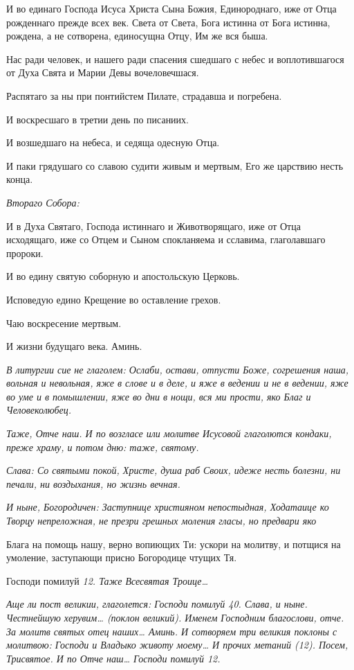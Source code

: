    И во единаго Господа Исуса Христа Сына Божия, Единороднаго, иже от
Отца рожденнаго прежде всех век. Света от Света, Бога истинна от
Бога истинна, рождена, а не сотворена, единосущна Отцу, Им же вся
быша.


   Нас ради человек, и нашего ради спасения сшедшаго с небес и
воплотившагося от Духа Свята и Марии Девы вочеловечшася.


   Распятаго за ны при понтийстем Пилате, страдавша и погребена.


   И воскресшаго в третии день по писаниих.


   И возшедшаго на небеса, и седяща одесную Отца.


   И паки грядушаго со славою судити живым и мертвым, Его же царствию
несть конца.


 \itshape Втораго Собора:\normalfont{}


   И в Духа Святаго, Господа истиннаго и Животворящаго, иже от Отца
исходящаго, иже со Отцем и Сыном спокланяема и сславима, глаголавшаго
пророки.


   И во едину святую соборную и апостольскую Церковь.


   Исповедую едино Крещение во оставление грехов.


   Чаю воскресение мертвым.


   И жизни будущаго века. Аминь.


 \itshape В литургии сие не глаголем:\normalfont{} Ослаби, остави, отпусти Боже, согрешения
наша, вольная и невольная, яже в слове и в деле, и яже в ведении и не в
ведении, яже во уме и в помышлении, яже во дни в нощи, вся ми прости, яко
Благ и Человеколюбец.


 \itshape Таже, Отче наш. И по возгласе или молитве Исусовой глаголются
кондаки, преже храму, и потом дню: таже, святому.\normalfont{}


 \itshape Слава:\normalfont{} Со святыми покой, Христе, душа раб Своих, идеже несть болезни,
ни печали, ни воздыхания, но жизнь вечная.


 \itshape И ныне, Богородичен:\normalfont{} Заступнице християном непостыдная, Ходатаице
ко Творцу непреложная, не презри грешных моления гласы, но предвари яко

Блага на помощь нашу, верно вопиющих Ти: ускори на молитву, и потщися
на умоление, заступающи присно Богородице чтущих Тя.


   Господи помилуй \itshape 12\normalfont{}. \itshape Таже\normalfont{} Всесвятая Троице…


 \itshape Аще ли пост великии, глаголется:\normalfont{} Господи помилуй \itshape 40\normalfont{}. \itshape Слава, и ныне\normalfont{}.
Честнейшую херувим… \itshape (поклон великий)\normalfont{}. Именем Господним благослови,
отче. За молитв святых отец наших… Аминь. \itshape И сотворяем три великия
поклоны с молитвою:\normalfont{} Господи и Владыко животу моему… \itshape И прочих
метаний (12). Посем\normalfont{}, \itshape Трисвятое\normalfont{}. \itshape И по\normalfont{} Отче наш… Господи помилуй
\itshape 12\normalfont{}.


